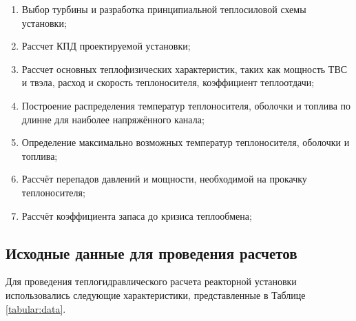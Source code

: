     \begin{enumerate}
        \item Выбор турбины и разработка принципиальной теплосиловой схемы установки;
        \item Рассчет КПД проектируемой установки;
        \item Рассчет основных теплофизических характеристик, таких как мощность ТВС и твэла, расход и скорость теплоносителя, коэффициент теплоотдачи;
        \item Построение распределения температур теплоносителя, оболочки и топлива по длинне для наиболее напряжённого канала; 
        \item Определение максимально возможных температур теплоносителя, оболочки и топлива;
        \item Рассчёт перепадов давлений и мощности, необходимой на прокачку теплоносителя;
        \item Рассчёт коэффициента запаса до кризиса теплообмена;
    \end{enumerate}

\subsection{Исходные данные для проведения расчетов}


Для проведения теплогидравлического расчета реакторной установки использовались следующие характеристики, представленные в Таблице \ref{tabular:data}.

